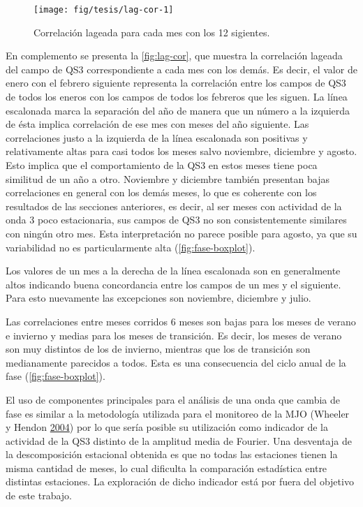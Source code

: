 \documentclass[spanish,a4paper,12p]{book}
\begin{document}
\begin{figure*}
\texttt{[image: fig/tesis/lag-cor-1]} \caption{Correlación lageada para cada mes con los 12 sigientes.}\label{fig:lag-cor}
\end{figure*}

En complemento se presenta la \autoref{fig:lag-cor}, que muestra la
correlación lageada del campo de QS3 correspondiente a cada mes con los
demás. Es decir, el valor de enero con el febrero siguiente representa
la correlación entre los campos de QS3 de todos los eneros con los
campos de todos los febreros que les siguen. La línea escalonada marca
la separación del año de manera que un número a la izquierda de ésta
implica correlación de ese mes con meses del año siguiente. Las
correlaciones justo a la izquierda de la línea escalonada son positivas
y relativamente altas para casi todos los meses salvo noviembre,
diciembre y agosto. Esto implica que el comportamiento de la QS3 en
estos meses tiene poca similitud de un año a otro. Noviembre y diciembre
también presentan bajas correlaciones en general con los demás meses, lo
que es coherente con los resultados de las secciones anteriores, es
decir, al ser meses con actividad de la onda 3 poco estacionaria, sus
campos de QS3 no son consistentemente similares con ningún otro mes.
Esta interpretación no parece posible para agosto, ya que su
variabilidad no es particularmente alta (\autoref{fig:fase-boxplot}).

Los valores de un mes a la derecha de la línea escalonada son en
generalmente altos indicando buena concordancia entre los campos de un
mes y el siguiente. Para esto nuevamente las excepciones son noviembre,
diciembre y julio.

Las correlaciones entre meses corridos 6 meses son bajas para los meses
de verano e invierno y medias para los meses de transición. Es decir,
los meses de verano son muy distintos de los de invierno, mientras que
los de transición son medianamente parecidos a todos. Esta es una
consecuencia del ciclo anual de la fase (\autoref{fig:fase-boxplot}).

El uso de componentes principales para el análisis de una onda que
cambia de fase es similar a la metodología utilizada para el monitoreo
de la MJO (Wheeler y Hendon \protect\hyperlink{ref-Wheeler2004}{2004})
por lo que sería posible su utilización como indicador de la actividad
de la QS3 distinto de la amplitud media de Fourier. Una desventaja de la
descomposición estacional obtenida es que no todas las estaciones tienen
la misma cantidad de meses, lo cual dificulta la comparación estadística
entre distintas estaciones. La exploración de dicho indicador está por
fuera del objetivo de este trabajo.
\end{document}
